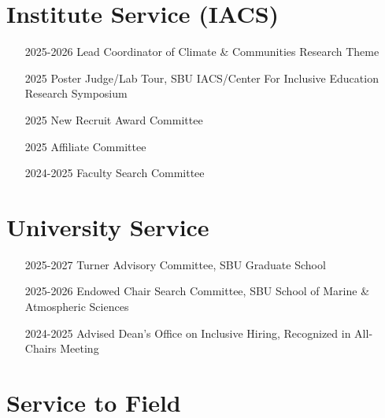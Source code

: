 \documentclass[]{res}
\begin{document}
\begin{resume}
\section{{Institute Service (IACS)}}

\begin{itemize}
\item[2025-2026] {Lead Coordinator of Climate \& Communities Research Theme}
\item[2025] {Poster Judge/Lab Tour,} SBU IACS/Center For Inclusive Education Research Symposium
\item[2025] {New Recruit Award Committee} 
\item[2025] {Affiliate Committee} 
\item[2024-2025] {Faculty Search Committee}
\end{itemize}

\section{{University Service}} 

\begin{itemize}
\item[2025-2027] {Turner Advisory Committee,} SBU Graduate School
\item[2025-2026] {Endowed Chair Search Committee,} SBU School of Marine \& Atmospheric Sciences
\item[2024-2025] {Advised Dean's Office on Inclusive Hiring,} Recognized in All-Chairs Meeting
\end{itemize}

\section{{Service to Field}} 


\end{resume}
\end{document}
